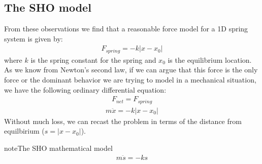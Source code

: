 \documentclass[letterpaper,10pt,english]{jupyterBook}
\begin{document}
\subsection{The SHO model}
\label{\detokenize{content/1_modeling/SHO-intro:the-sho-model}}
\sphinxAtStartPar
From these observations we find that a reasonable force model for a 1D spring system is given by:
\begin{equation*}
\begin{split}F_{spring} = -k |x-x_0|\end{split}
\end{equation*}
\sphinxAtStartPar
where \(k\) is the spring constant for the spring and \(x_0\) is the equilibrium location. As we know from Newton’s second law, if we can argue that this force is the only force or the dominant behavior we are trying to model in a mechanical situation, we have the following ordinary differential equation:
\begin{equation*}
\begin{split}F_{net} = F_{spring}\end{split}
\end{equation*}\begin{equation*}
\begin{split}m\ddot{x} = -k|x-x_0|\end{split}
\end{equation*}
\sphinxAtStartPar
Without much loss, we can recast the problem in terms of the distance from equilbirium (\(s=|x-x_0|\)). 

\begin{sphinxadmonition}{note}{The SHO mathematical model}
\begin{equation*}
\begin{split}m\ddot{s} = -ks\end{split}
\end{equation*}\end{sphinxadmonition}
\end{document}
